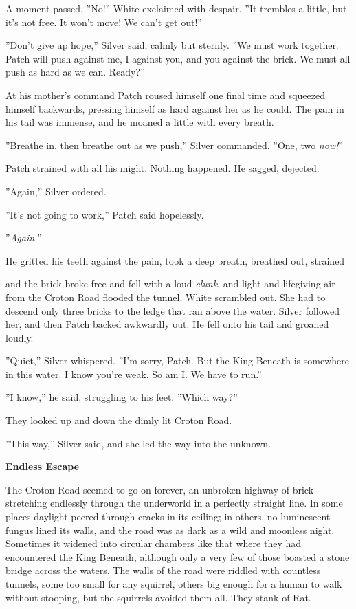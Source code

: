 \documentclass[11pt]{article}
\begin{document}
 A moment passed. ''No!'' White exclaimed with despair. ''It trembles a little, but it's not free. It won't move! We can't get out!''\par
 ''Don't give up hope,'' Silver said, calmly but sternly. ''We must work together. Patch will push against me, I against you, and you against the brick. We must all push as hard as we can. Ready?''\par
 At his mother's command Patch roused himself one final time and squeezed himself backwards, pressing himself as hard against her as he could. The pain in his tail was immense, and he moaned a little with every breath.\par
 ''Breathe in, then breathe out as we push,'' Silver commanded. ''One, two %
 {\it now!}''\par
 Patch strained with all his might. Nothing happened. He sagged, dejected.\par
 ''Again,'' Silver ordered.\par
 ''It's not going to work,'' Patch said hopelessly.\par
 ''{\it Again.}''\par
 He gritted his teeth against the pain, took a deep breath, breathed out, strained %
\par
 and the brick broke free and fell with a loud {\it clunk}, and light and lifegiving air from the Croton Road flooded the tunnel. White scrambled out. She had to descend only three bricks to the ledge that ran above the water. Silver followed her, and then Patch backed awkwardly out. He fell onto his tail and groaned loudly.\par
 ''Quiet,'' Silver whispered. ''I'm sorry, Patch. But the King Beneath is somewhere in this water. I know you're weak. So am I. We have to run.''\par
 ''I know,'' he said, struggling to his feet. ''Which way?''\par
 They looked up and down the dimly lit Croton Road.\par
 ''This way,'' Silver said, and she led the way into the unknown.\par
\par
{\bf Endless Escape\par
}\par
 The Croton Road seemed to go on forever, an unbroken highway of brick stretching endlessly through the underworld in a perfectly straight line. In some places daylight peered through cracks in its ceiling; in others, no luminescent fungus lined its walls, and the road was as dark as a wild and moonless night. Sometimes it widened into circular chambers like that where they had encountered the King Beneath, although only a very few of those boasted a stone bridge across the waters. The walls of the road were riddled with countless tunnels, some too small for any squirrel, others big enough for a human to walk without stooping, but the squirrels avoided them all. They stank of Rat.\par
\end{document}

